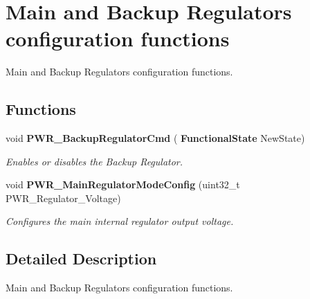 \section{Main and Backup Regulators configuration functions}
\label{group__PWR__Group4}


Main and Backup Regulators configuration functions.  


\subsection*{Functions}
\begin{DoxyCompactItemize}
\item 
void \textbf{ P\+W\+R\+\_\+\+Backup\+Regulator\+Cmd} (\textbf{ Functional\+State} New\+State)
\begin{DoxyCompactList}\small\item\em Enables or disables the Backup Regulator. \end{DoxyCompactList}\item 
void \textbf{ P\+W\+R\+\_\+\+Main\+Regulator\+Mode\+Config} (uint32\+\_\+t P\+W\+R\+\_\+\+Regulator\+\_\+\+Voltage)
\begin{DoxyCompactList}\small\item\em Configures the main internal regulator output voltage. \end{DoxyCompactList}\end{DoxyCompactItemize}


\subsection{Detailed Description}
Main and Backup Regulators configuration functions. 

